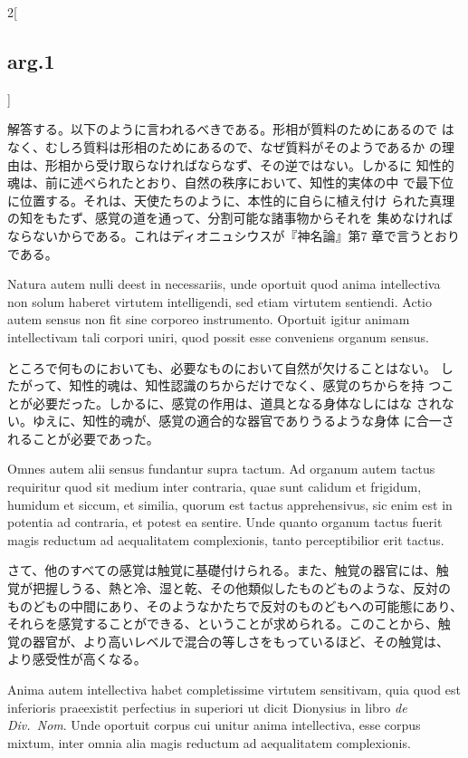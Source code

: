 \documentclass[paper=a4paper,fontsize=10pt,jafontsize=9pt,titlepage]{jlreq}
\begin{document}
\begin{paracol}{2}[\subsection{arg.1}]
\switchcolumn

 解答する。以下のように言われるべきである。形相が質料のためにあるので
 はなく、むしろ質料は形相のためにあるので、なぜ質料がそのようであるか
 の理由は、形相から受け取らなければならなず、その逆ではない。しかるに
 知性的魂は、前に述べられたとおり、自然の秩序において、知性的実体の中
 で最下位に位置する。それは、天使たちのように、本性的に自らに植え付け
 られた真理の知をもたず、感覚の道を通って、分割可能な諸事物からそれを
 集めなければならないからである。これはディオニュシウスが『神名論』第7
 章で言うとおりである。
 
\switchcolumn*


 Natura autem nulli deest in necessariis, unde oportuit quod anima
 intellectiva non solum haberet virtutem intelligendi, sed etiam
 virtutem sentiendi. Actio autem sensus non fit sine corporeo
 instrumento. Oportuit igitur animam intellectivam tali corpori uniri,
 quod possit esse conveniens organum sensus.

\switchcolumn

 ところで何ものにおいても、必要なものにおいて自然が欠けることはない。
 したがって、知性的魂は、知性認識のちからだけでなく、感覚のちからを持
 つことが必要だった。しかるに、感覚の作用は、道具となる身体なしにはな
 されない。ゆえに、知性的魂が、感覚の適合的な器官でありうるような身体
 に合一されることが必要であった。
 
\switchcolumn*


 Omnes autem alii sensus fundantur supra tactum. Ad organum autem
 tactus requiritur quod sit medium inter contraria, quae sunt calidum
 et frigidum, humidum et siccum, et similia, quorum est tactus
 apprehensivus, sic enim est in potentia ad contraria, et potest ea
 sentire. Unde quanto organum tactus fuerit magis reductum ad
 aequalitatem complexionis, tanto perceptibilior erit tactus.

\switchcolumn

さて、他のすべての感覚は触覚に基礎付けられる。また、触覚の器官には、触
覚が把握しうる、熱と冷、湿と乾、その他類似したものどものような、反対の
ものどもの中間にあり、そのようなかたちで反対のものどもへの可能態にあり、
それらを感覚することができる、ということが求められる。このことから、触
覚の器官が、より高いレベルで混合の等しさをもっているほど、その触覚は、
より感受性が高くなる。
 
\switchcolumn*


 Anima autem intellectiva habet completissime virtutem sensitivam,
 quia quod est inferioris praeexistit perfectius in superiori ut dicit
 Dionysius in libro {\itshape de Div.~Nom}. Unde oportuit corpus cui unitur anima
 intellectiva, esse corpus mixtum, inter omnia alia magis reductum ad
 aequalitatem complexionis.


\end{paracol}
\end{document}
